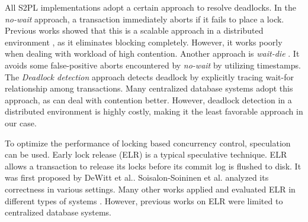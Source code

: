 \documentclass[conference]{IEEEtran}
\begin{document}
All S2PL implementations adopt a certain approach to resolve deadlocks.
In the \emph{no-wait}
\cite{EvaluationOfCC:journals/pvldb/HardingAPS17}
approach, a transaction immediately aborts if it fails to place a lock.
Previous works showed that this is a scalable approach in a distributed environment \cite{EvaluationCC1000Cores:journals/pvldb/YuBPDS14}\cite{EvaluationOfCC:journals/pvldb/HardingAPS17},
as it eliminates blocking completely.
However, it works poorly when dealing with workload of high contention.
Another approach is \emph{wait-die} \cite{LockNoWait:journals/csur/BernsteinG81}. 
It avoids some false-positive aborts encountered by \emph{no-wait} by utilizing timestamps.
The \emph{Deadlock detection} approach \cite{LockCC:conf/ds/GrayLPT76} detects deadlock by explicitly tracing wait-for relationship among transactions.
Many centralized database systems \cite{MySQL}\cite{PostgreSQL} adopt this approach, as can deal with contention better.
However, deadlock detection in a distributed environment is highly costly, making it the least favorable approach in our case.

To optimize the performance of locking based concurrency control, speculation can be used.
Early lock release (ELR)
\cite{ELR:dewitt_implementation_1984}\cite{PS2PL:conf/icdt/Soisalon-SoininenY95}
\cite{Aether:journals/pvldb/JohnsonPSAA10}
\cite{EfficientLocking:conf/vldb/KimuraGK12}
\cite{Actor-Oriented-DB:conf/icde/Bernstein18}
is a typical speculative technique.
ELR allows a transaction to release its locks before its commit log is flushed to disk.
It was first proposed by DeWitt et al.\cite{ELR:dewitt_implementation_1984}.
Soisalon-Soininen et al.\cite{PS2PL:conf/icdt/Soisalon-SoininenY95} analyzed its correctness in various settings.
Many other works applied and evaluated ELR in different types of systems \cite{Aether:journals/pvldb/JohnsonPSAA10}\cite{EfficientLocking:conf/vldb/KimuraGK12}\cite{EfficientLocking:conf/vldb/KimuraGK12}\cite{Aether:journals/pvldb/JohnsonPSAA10}.
However, previous works on ELR were limited to centralized database systems.
\end{document}
